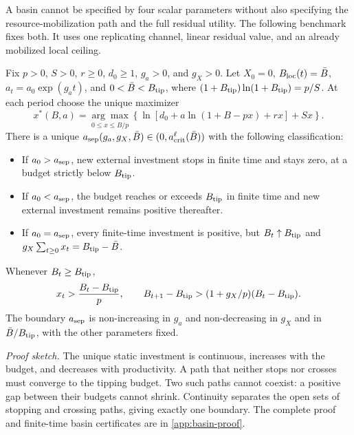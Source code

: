 A basin cannot be specified by four scalar parameters without also
specifying the resource-mobilization path and the full residual utility.
The following benchmark fixes both. It uses one replicating channel,
linear residual value, and an already mobilized local ceiling.

\begin{proposition}
\label{prop:basin}
Fix $p>0$, $S>0$, $r\geq0$, $d_0\geq1$, $g_a>0$, and $g_X>0$.
Let $X_0=0$, $B_{\rm loc}(t)=\bar B$, $a_t=a_0\exp(g_at)$, and
$0<\bar B<B_{\rm tip}$, where
$(1+B_{\rm tip})\ln(1+B_{\rm tip})=p/S$.
At each period choose the unique maximizer
\begin{equation}
 x^*(B,a)=\underset{0\leq x\leq B/p}{\arg\max}
 \left\{\ln[d_0+a\ln(1+B-px)+rx]+Sx\right\}.
 \label{eq:basin-policy}
\end{equation}
There is a unique
$a_{\rm sep}(g_a,g_X,\bar B)\in(0,a_{\rm crit}^{\ell}(\bar B))$
with the following classification:
\begin{itemize}[leftmargin=*,nosep]
\item If $a_0>a_{\rm sep}$, new external investment stops in finite time
and stays zero, at a budget strictly below $B_{\rm tip}$.
\item If $a_0<a_{\rm sep}$, the budget reaches or exceeds $B_{\rm tip}$
in finite time and new external investment remains positive thereafter.
\item If $a_0=a_{\rm sep}$, every finite-time investment is positive,
but $B_t\uparrow B_{\rm tip}$ and
$g_X\sum_{t\geq0}x_t=B_{\rm tip}-\bar B$.
\end{itemize}
Whenever $B_t\geq B_{\rm tip}$,
\begin{equation}
 x_t>\frac{B_t-B_{\rm tip}}p,\qquad
 B_{t+1}-B_{\rm tip}>
 (1+g_X/p)(B_t-B_{\rm tip}).
 \label{eq:runaway-bound}
\end{equation}
The boundary $a_{\rm sep}$ is non-increasing in $g_a$ and
non-decreasing in $g_X$ and in $\bar B/B_{\rm tip}$, with the other
parameters fixed.
\end{proposition}
\noindent\emph{Proof sketch.}
The unique static investment is continuous, increases with the budget,
and decreases with productivity. A path that neither stops nor crosses
must converge to the tipping budget. Two such paths cannot coexist:
a positive gap between their budgets cannot shrink. Continuity separates
the open sets of stopping and crossing paths, giving exactly one boundary.
The complete proof and finite-time basin certificates are in
\cref{app:basin-proof}.

